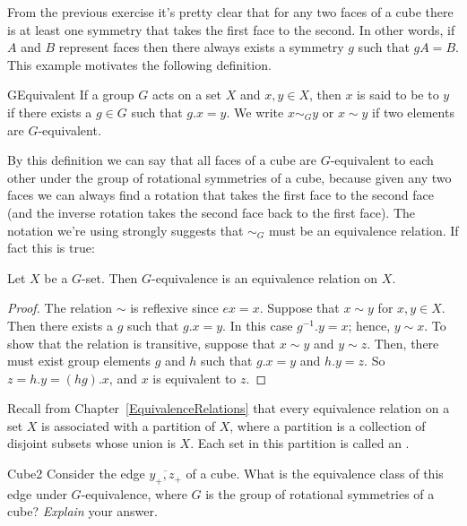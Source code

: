 From the previous exercise it's pretty clear that for any two faces of a cube there is at least one symmetry that takes the first face to the second.  In other words, if $A$ and $B$ represent faces then there always exists a symmetry $g$ such that $gA=B$.  This example motivates the following definition.

\begin{defn}{GEquivalent}
If a group $G$ acts on a set $X$ and $x, y \in X$, then $x$ is said to be
 to $y$ if there exists a
$g \in G$ such that $g.x =y$. We write $x \sim_Gy$ or $x \sim y$ if
two elements are $G$-equivalent.
\end{defn}
By this definition we can say that all faces of a cube are $G$-equivalent to each other under the group of rotational symmetries of a cube, because given any two faces we can always find a rotation that takes the first face to the second face (and the inverse rotation takes the second face back to the first face).
The notation we're using strongly suggests that $\sim_G$ must be an equivalence relation.  If fact this is true:

\begin{prop}{}
Let $X$ be a $G$-set. Then $G$-equivalence is an equivalence relation
on $X$. 
\end{prop}
\begin{proof}
The relation $\sim$ is reflexive since $ex = x$. Suppose that $x \sim
y$ for $x, y \in X$. Then there exists a $g$ such that $g.x = y$. In
this case $g^{-1}.y=x$; hence, $y \sim x$. To show that the relation is
transitive, suppose that $x \sim y$ and $y \sim z$. Then, there must
exist group elements $g$ and $h$ such that $g.x = y$ and $h.y= z$. So $z
= h.y = (hg).x$, and $x$ is equivalent to $z$.
\end{proof}

Recall from Chapter~\ref{EquivalenceRelations} that every equivalence relation on a set $X$ is associated with a partition of $X$, where a partition is a collection of disjoint subsets whose union is $X$. Each set in this partition is called an .

\begin{exercise}{Cube2}
Consider the edge $\overline{y_+,z_+}$ of a cube.  What is the equivalence class of this edge under $G$-equivalence, where $G$ is the group of rotational symmetries of a cube? \emph{Explain} your answer.
\end {exercise}


